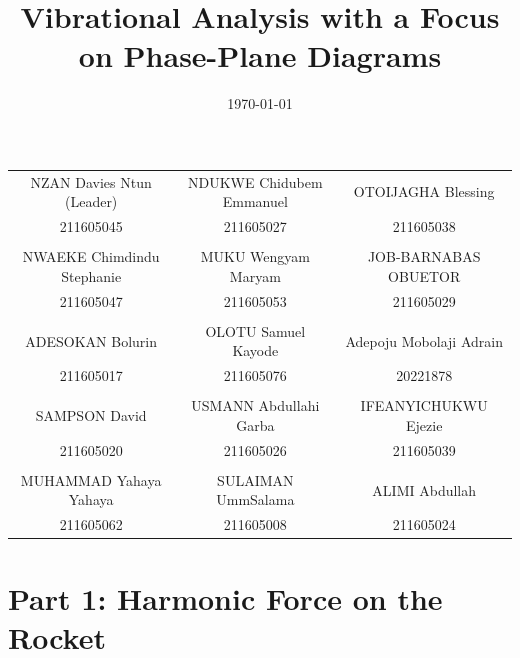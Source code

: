 \documentclass[12pt,a4paper]{article}
\title{\textbf{Vibrational Analysis with a Focus on Phase-Plane Diagrams}}
\date{\today}
\begin{document}
\maketitle

\begin{center}
    \small
    \begin{tabular}{c c c}
        NZAN Davies Ntun (Leader) & NDUKWE Chidubem Emmanuel & OTOIJAGHA Blessing \\
        211605045 & 211605027 & 211605038 \\
        & & \\
        NWAEKE Chimdindu Stephanie & MUKU Wengyam Maryam & JOB-BARNABAS OBUETOR \\
        211605047 & 211605053 & 211605029 \\
        & & \\
        ADESOKAN Bolurin & OLOTU Samuel Kayode & Adepoju Mobolaji Adrain \\
        211605017 & 211605076 & 20221878 \\
        & & \\
        SAMPSON David & USMANN Abdullahi Garba & IFEANYICHUKWU Ejezie \\
        211605020 & 211605026 & 211605039 \\
        & & \\
        MUHAMMAD Yahaya Yahaya & SULAIMAN UmmSalama & ALIMI Abdullah \\
        211605062 & 211605008 & 211605024 \\
    \end{tabular}
\end{center}

\tableofcontents
\newpage

\section{Part 1: Harmonic Force on the Rocket}
\end{document}
